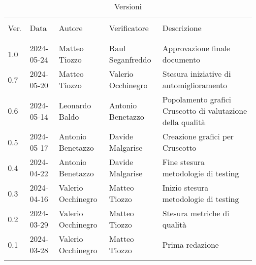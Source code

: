 \documentclass[italian,12pt]{article} %
\begin{document}

\newpage

\captionsetup[table]{list=no}
\begin{table}[!h]
	\caption*{Versioni}
	\footnotesize
	\begin{center}
		\begin{tabular}{ l l l l p{6cm} }
			\hline                                                                                                                   \\[-2ex]
			Ver. & Data       & Autore             & Verificatore       & Descrizione                                                \\
			\\[-2ex] \hline \\[-1.5ex]
			1.0  & 2024-05-24 & Matteo Tiozzo      & Raul Seganfreddo   & Approvazione finale documento                              \\
			0.7  & 2024-05-20 & Matteo Tiozzo      & Valerio Occhinegro & Stesura iniziative di automiglioramento                    \\
			0.6  & 2024-05-14 & Leonardo Baldo     & Antonio Benetazzo  & Popolamento grafici Cruscotto di valutazione della qualità \\
			0.5  & 2024-05-17 & Antonio Benetazzo  & Davide Malgarise   & Creazione grafici per Cruscotto                            \\
			0.4  & 2024-04-22 & Antonio Benetazzo  & Davide Malgarise   & Fine stesura metodologie di testing                        \\
			0.3  & 2024-04-16 & Valerio Occhinegro & Matteo Tiozzo      & Inizio stesura metodologie di testing                      \\
			0.2  & 2024-03-29 & Valerio Occhinegro & Matteo Tiozzo      & Stesura metriche di qualità                                \\
			0.1  & 2024-03-28 & Valerio Occhinegro & Matteo Tiozzo      & Prima redazione                                            \\
			\\[-1.5ex] \hline
		\end{tabular}
	\end{center}
\end{table}
\captionsetup[table]{list=yes}
\newpage
\tableofcontents
\listoftables
\listoffigures
\newpage





\end{document}
